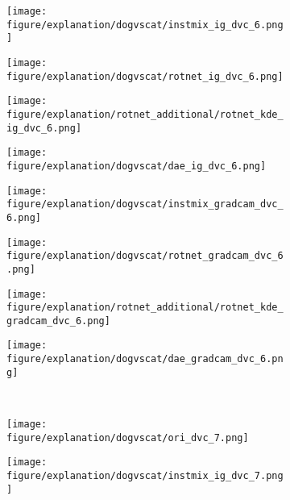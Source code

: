 \documentclass{article} \usepackage{iclr2021_conference,times}
\begin{document}
\begin{figure}[h!]
\begin{subfigure}{.11\textwidth}
  \centering
  \texttt{[image: figure/explanation/dogvscat/instmix\_ig\_dvc\_6.png]}
\end{subfigure}
\hspace{-2mm}
\begin{subfigure}{.11\textwidth}
  \centering
  \texttt{[image: figure/explanation/dogvscat/rotnet\_ig\_dvc\_6.png]}
\end{subfigure}
\hspace{-2mm}
\begin{subfigure}{.11\textwidth}
  \centering
  \texttt{[image: figure/explanation/rotnet\_additional/rotnet\_kde\_ig\_dvc\_6.png]}
\end{subfigure}
\hspace{-2mm}
\begin{subfigure}{.11\textwidth}
  \centering
  \texttt{[image: figure/explanation/dogvscat/dae\_ig\_dvc\_6.png]}
\end{subfigure}
\hspace{-2mm}
\begin{subfigure}{.11\textwidth}
  \centering
  \texttt{[image: figure/explanation/dogvscat/instmix\_gradcam\_dvc\_6.png]}
\end{subfigure}
\hspace{-2mm}
\begin{subfigure}{.11\textwidth}
  \centering
  \texttt{[image: figure/explanation/dogvscat/rotnet\_gradcam\_dvc\_6.png]}
\end{subfigure}
\hspace{-2mm}
\begin{subfigure}{.11\textwidth}
  \centering
  \texttt{[image: figure/explanation/rotnet\_additional/rotnet\_kde\_gradcam\_dvc\_6.png]}
\end{subfigure}
\hspace{-2mm}
\begin{subfigure}{.11\textwidth}
  \centering
  \texttt{[image: figure/explanation/dogvscat/dae\_gradcam\_dvc\_6.png]}
\end{subfigure}\\
\begin{subfigure}{.11\textwidth}
  \centering
  \texttt{[image: figure/explanation/dogvscat/ori\_dvc\_7.png]}
\end{subfigure}
\hspace{-2mm}
\begin{subfigure}{.11\textwidth}
  \centering
  \texttt{[image: figure/explanation/dogvscat/instmix\_ig\_dvc\_7.png]}

\end{subfigure}
\end{figure}
\end{document}
